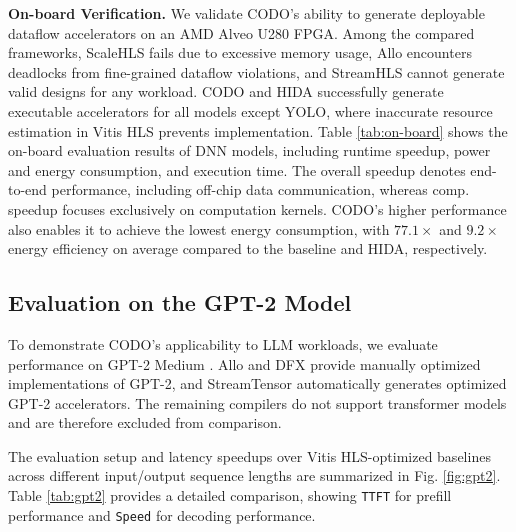 \documentclass[conference]{IEEEtran}
\begin{document}
\textbf{On-board Verification.} 
We validate CODO's ability to generate deployable dataflow accelerators on an AMD Alveo U280 FPGA. Among the compared frameworks, ScaleHLS fails due to excessive memory usage, Allo encounters deadlocks from fine-grained dataflow violations, and StreamHLS cannot generate valid designs for any workload.
CODO and HIDA successfully generate executable accelerators for all models except YOLO, where inaccurate resource estimation in Vitis HLS prevents implementation.
Table \ref{tab:on-board} shows the on-board evaluation results of DNN models, including runtime speedup, power and energy consumption, and execution time. 
The overall speedup denotes end-to-end performance, including off-chip data communication, whereas comp. speedup focuses exclusively on computation kernels.
CODO's higher performance also enables it to achieve the lowest energy consumption, with $ 77.1 \times$ and $ 9.2 \times$ energy efficiency on average compared to the baseline and HIDA, respectively. 


\subsection{Evaluation on the GPT-2 Model}\label{On-board Verification}
To demonstrate CODO's applicability to LLM workloads, we evaluate performance on GPT-2 Medium \cite{gpt2medium_hf}.  Allo and DFX provide manually optimized implementations of GPT-2, and StreamTensor automatically generates optimized GPT-2 accelerators. The remaining compilers do not support transformer models and are therefore excluded from comparison.    


The evaluation setup and latency speedups over Vitis HLS-optimized baselines across different input/output sequence lengths are summarized in Fig. \ref{fig:gpt2}. 
Table \ref{tab:gpt2} provides a detailed comparison, showing \texttt{TTFT} for prefill performance and \texttt{Speed} for decoding performance.
\end{document}
